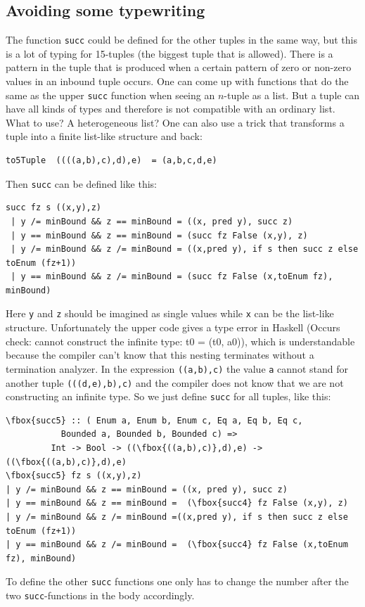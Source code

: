 \documentclass{tmr}
\newcommand{\authornote}[3]{{\color{#2} {\sc #1}: #3}}
\newcommand\bay[1]{\authornote{edward}{blue}{#1}}
\newcommand\tkv[1]{\authornote{Tillmann}{green}{#1}}
\begin{document}
\subsection{Avoiding some typewriting}


The function \verb|succ| could be defined for the other tuples in the same way, but this is a lot of typing for 15-tuples (the biggest tuple that is allowed). 
There is a pattern in the tuple that is produced when a certain pattern of zero or non-zero values in an inbound tuple occurs.
One can come up with functions that do the same as the upper \verb|succ| function when seeing an $n$-tuple as a list.
But a tuple can have all kinds of types and therefore is not compatible with an ordinary list. What to use? A heterogeneous list? One can also use a trick that transforms a tuple into a finite list-like structure and back:

\begin{Verbatim}
to5Tuple  ((((a,b),c),d),e)  = (a,b,c,d,e)
\end{Verbatim}

Then \verb|succ| can be defined like this:
\begin{Verbatim}
succ fz s ((x,y),z)
 | y /= minBound && z == minBound = ((x, pred y), succ z)
 | y == minBound && z == minBound = (succ fz False (x,y), z)
 | y /= minBound && z /= minBound = ((x,pred y), if s then succ z else toEnum (fz+1))
 | y == minBound && z /= minBound = (succ fz False (x,toEnum fz), minBound)
\end{Verbatim}
Here \verb|y| and \verb|z| should be imagined as single values while \verb|x| can be the list-like structure. 
Unfortunately the upper code gives a type error in Haskell (Occurs check: cannot construct the infinite type: t0 = (t0, a0)), which is understandable because the compiler can't know that this nesting terminates without a termination analyzer. In the expression \verb|((a,b),c)|  the value \verb|a| cannot stand for another tuple \eg \verb|(((d,e),b),c)| and the compiler does not know that we are not constructing an infinite type.
So we just define \verb|succ| for all tuples, like this:

\begin{Verbatim}[commandchars=\\\{\}]
\fbox{succ5} :: ( Enum a, Enum b, Enum c, Eq a, Eq b, Eq c,
           Bounded a, Bounded b, Bounded c) =>
         Int -> Bool -> ((\fbox{((a,b),c)},d),e) -> ((\fbox{((a,b),c)},d),e)
\fbox{succ5} fz s ((x,y),z)
| y /= minBound && z == minBound = ((x, pred y), succ z)
| y == minBound && z == minBound =  (\fbox{succ4} fz False (x,y), z)
| y /= minBound && z /= minBound =((x,pred y), if s then succ z else toEnum (fz+1))
| y == minBound && z /= minBound =  (\fbox{succ4} fz False (x,toEnum fz), minBound)
\end{Verbatim}
To define the other \verb|succ| functions one only has to change the number after the two \verb|succ|-functions in the body accordingly. 
\end{document}
